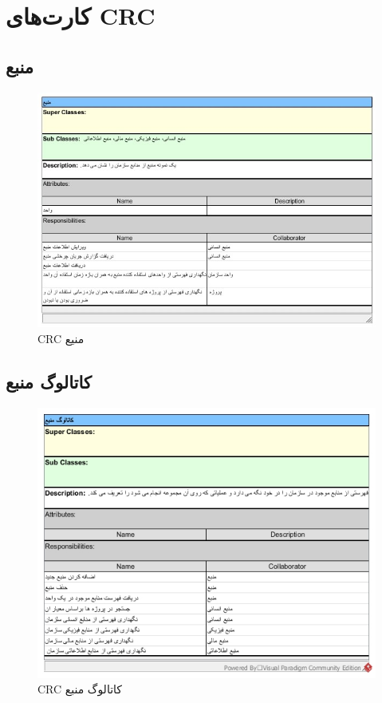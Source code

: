 \chapter{کارت‌های CRC}

\section{منبع}
\begin{figure}[H]
	\centering
	\includegraphics[scale=0.8]{img/crc/Resource}
	\caption{CRC منیع }
\end{figure}

\section{کاتالوگ منبع}
\begin{figure}[H]
	\centering
	\includegraphics[scale=0.8]{img/crc/ResourceCatalogue}
	\caption{CRC کاتالوگ منبع }
\end{figure}


